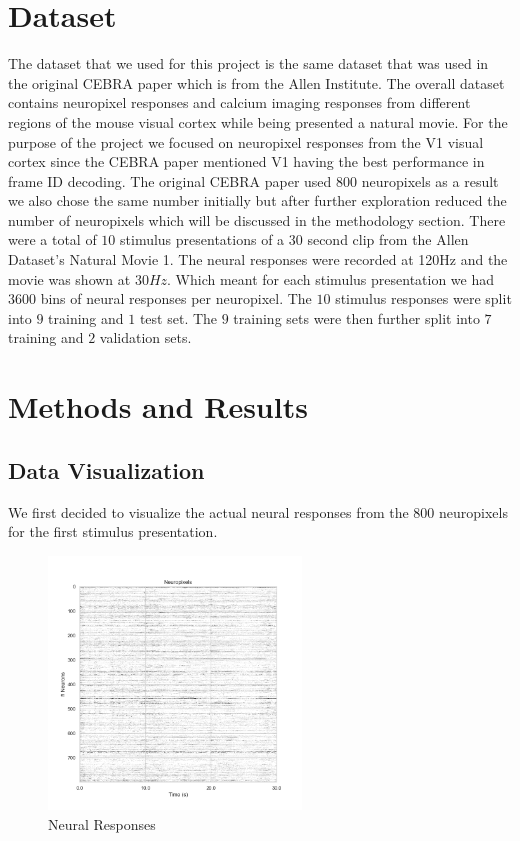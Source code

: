 \documentclass[12pt, letterpaper]{article}
\begin{document}
\section{Dataset}
\label{sec:dataset}
The dataset that we used for this project is the same dataset that was used in the original CEBRA paper which is from the Allen Institute. The overall dataset contains neuropixel responses and calcium imaging responses from different regions of the mouse visual cortex while being presented a natural movie. For the purpose of the project we focused on neuropixel responses from the V1 visual cortex since the CEBRA paper mentioned V1 having the best performance in frame ID decoding. The original CEBRA paper used $800$ neuropixels as a result we also chose the same number initially but after further exploration reduced the number of neuropixels which will be discussed in the methodology section. There were a total of $10$ stimulus presentations of a $30$ second clip from the Allen Dataset's Natural Movie 1. The neural responses were recorded at 120Hz and the movie was shown at $30Hz$. Which meant for each stimulus presentation we had $3600$ bins of neural responses per neuropixel. The $10$ stimulus responses were split into $9$ training and $1$ test set. The $9$ training sets were then further split into $7$ training and $2$ validation sets. 

\section{Methods and Results}
\label{sec:methods_and_results}
\subsection{Data Visualization}
\label{subsec:data_visualization}
We first decided to visualize the actual neural responses from the 800 neuropixels for the first stimulus presentation. 

\begin{figure}[H]
    \centering
    \includegraphics[width=0.6\textwidth]{neuropixels.png}
    \caption{Neural Responses}
    \label{fig:neuropixels}
\end{figure}
\end{document}
